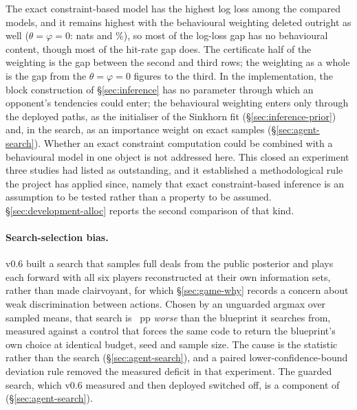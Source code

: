 The exact constraint-based model has the highest log loss among the compared models, and it
remains highest with the behavioural weighting deleted outright as well ($\theta = \varphi = 0$:
\vsevenBeliefPriorlessNLL{} nats and \vsevenBeliefPriorlessHit\%), so most of the log-loss gap has
no behavioural content, though most of the hit-rate gap does. The certificate half of the weighting
is the gap between the second and third rows; the weighting as a whole is the gap from the
$\theta = \varphi = 0$ figures to the third. In the implementation, the block construction of
\S\ref{sec:inference} has no parameter through which an opponent's tendencies could enter; the
behavioural weighting enters only through the deployed paths, as the initialiser of the Sinkhorn fit
(\S\ref{sec:inference-prior}) and, in the search, as an importance weight on exact samples
(\S\ref{sec:agent-search}). Whether an exact constraint computation could be combined with a
behavioural model in one object is not addressed here. This closed an
experiment three studies had listed as outstanding, and it established a methodological rule the
project has applied since, namely that exact constraint-based inference is an assumption to be
tested rather than a property to be assumed. \S\ref{sec:development-alloc} reports the second
comparison of that kind.

\paragraph{Search-selection bias.} v0.6
built a search that samples full deals from the public posterior and plays each forward with all six
players reconstructed at their own information sets, rather than made clairvoyant, for which
\S\ref{sec:game-why} records a concern about weak discrimination between actions. Chosen by an unguarded argmax over sampled means,
that search is \vsixCurseGap{}~pp \emph{worse} than the blueprint it searches from, measured against a
control that forces the same code to return the blueprint's own choice at identical budget, seed and
sample size. The cause is the statistic rather than the search (\S\ref{sec:agent-search}), and a
paired lower-confidence-bound deviation rule removed the measured deficit in that experiment. The guarded search, which v0.6 measured and then deployed switched off, is a component
of \sestina{} (\S\ref{sec:agent-search}).

